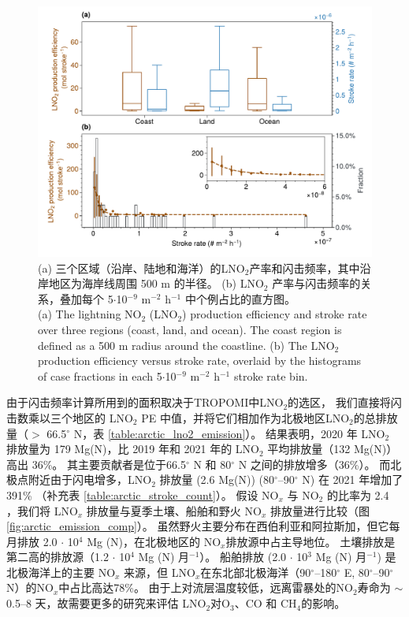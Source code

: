\begin{figure}[htbp]
\centering
\includegraphics[width=15cm]{./figures/arctic_pe_rate.pdf}
\caption{
(a) 三个区域（沿岸、陆地和海洋）的LNO$_2$产率和闪击频率，其中沿岸地区为海岸线周围 500 m 的半径。
(b) LNO$_2$ 产率与闪击频率的关系，叠加每个 5$\cdot$10$^{-9}$ m$^{-2}$ h$^{-1}$ 中个例占比的直方图。\\
(a) The lightning NO$_2$ (LNO$_2$) production efficiency and stroke rate over three regions (coast, land, and ocean).
The coast region is defined as a 500 m radius around the coastline.
(b) The LNO$_2$ production efficiency versus stroke rate, overlaid by the histograms of case fractions in each 5$\cdot$10$^{-9}$ m$^{-2}$ h$^{-1}$ stroke rate bin.
}
\label{fig:arctic_pe_rate}
\end{figure}


由于闪击频率计算所用到的面积取决于TROPOMI中LNO$_2$的选区，
我们直接将闪击数乘以三个地区的 LNO$_2$ PE 中值，并将它们相加作为北极地区LNO$_2$的总排放量（$>$ 66.5$^{\circ}$ N，表 \ref{table:arctic_lno2_emission}）。
结果表明，2020 年 LNO$_2$ 排放量为 179 Mg(N)，比 2019 年和 2021 年的 LNO$_2$ 平均排放量（132 Mg(N)）高出 36\%。
其主要贡献者是位于66.5$^{\circ}$ N 和 80$^{\circ}$ N 之间的排放增多（36\%）。
而北极点附近由于闪电增多，LNO$_2$ 排放量 (2.6 Mg(N)) (80$^{\circ}$--90$^{\circ}$ N) 在 2021 年增加了 391\% （补充表 \ref{table:arctic_stroke_count}）。
假设 NO$_x$ 与 NO$_2$ 的比率为 2.4 \citep{Silvern.2018}，我们将 LNO$_x$ 排放量与夏季土壤、船舶和野火 NO$_x$ 排放量进行比较（图\ref{fig:arctic_emission_comp}）。
虽然野火主要分布在西伯利亚和阿拉斯加，但它每月排放 2.0 $\cdot$ 10$^4$ Mg (N)，在北极地区的 NO$_x$排放源中占主导地位。
土壤排放是第二高的排放源（1.2 $\cdot$ 10$^4$ Mg (N) 月$^{-1}$）。
船舶排放 (2.0 $\cdot$ 10$^3$ Mg (N) 月$^{-1}$) 是北极海洋上的主要 NO$_x$ 来源，但 LNO$_x$在东北部北极海洋（90$^{\circ}$--180$^{\circ}$ E, 80$^{\circ}$--90$^{\circ}$ N）的NO$_x$中占比高达78\%。
由于上对流层温度较低，远离雷暴处的NO$_2$寿命为 $\sim$ 0.5--8 天\citep{Schumann.2007,Nault.2017}，故需要更多的研究来评估 LNO$_2$对O$_3$、CO 和 CH$_4$的影响。

